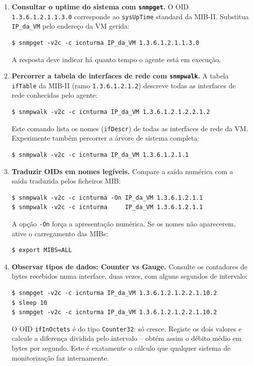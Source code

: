 \documentclass[11pt,a4paper]{article}
\begin{document}
\begin{enumerate}[label=\arabic*.]
  \item \textbf{Consultar o uptime do sistema com \texttt{snmpget}.} O OID \texttt{1.3.6.1.2.1.1.3.0} corresponde ao \texttt{sysUpTime} standard da MIB-II. Substitua \texttt{IP\_da\_VM} pelo endereço da VM gerida:
\begin{lstlisting}
$ snmpget -v2c -c icnturma IP_da_VM 1.3.6.1.2.1.1.3.0
\end{lstlisting}
  A resposta deve indicar há quanto tempo o agente está em execução.

  \item \textbf{Percorrer a tabela de interfaces de rede com \texttt{snmpwalk}.} A tabela \texttt{ifTable} da MIB-II (ramo \texttt{1.3.6.1.2.1.2}) descreve todas as interfaces de rede conhecidas pelo agente:
\begin{lstlisting}
$ snmpwalk -v2c -c icnturma IP_da_VM 1.3.6.1.2.1.2.2.1.2
\end{lstlisting}
  Este comando lista os nomes (\texttt{ifDescr}) de todas as interfaces de rede da VM. Experimente também percorrer a árvore de sistema completa:
\begin{lstlisting}
$ snmpwalk -v2c -c icnturma IP_da_VM 1.3.6.1.2.1.1
\end{lstlisting}

  \item \textbf{Traduzir OIDs em nomes legíveis.} Compare a saída numérica com a saída traduzida pelos ficheiros MIB:
\begin{lstlisting}
$ snmpwalk -v2c -c icnturma -On IP_da_VM 1.3.6.1.2.1.1
$ snmpwalk -v2c -c icnturma     IP_da_VM 1.3.6.1.2.1.1
\end{lstlisting}
  A opção \texttt{-On} força a apresentação numérica. Se os nomes não aparecerem, ative o carregamento das MIBs:
\begin{lstlisting}
$ export MIBS=ALL
\end{lstlisting}

  \item \textbf{Observar tipos de dados: Counter vs Gauge.} Consulte os contadores de bytes recebidos numa interface, duas vezes, com alguns segundos de intervalo:
\begin{lstlisting}
$ snmpget -v2c -c icnturma IP_da_VM 1.3.6.1.2.1.2.2.1.10.2
$ sleep 10
$ snmpget -v2c -c icnturma IP_da_VM 1.3.6.1.2.1.2.2.1.10.2
\end{lstlisting}
  O OID \texttt{ifInOctets} é do tipo \texttt{Counter32}: só cresce. Registe os dois valores e calcule a diferença dividida pelo intervalo -- obtém assim o débito médio em bytes por segundo. Este é exatamente o cálculo que qualquer sistema de monitorização faz internamente.


\end{enumerate}
\end{document}
